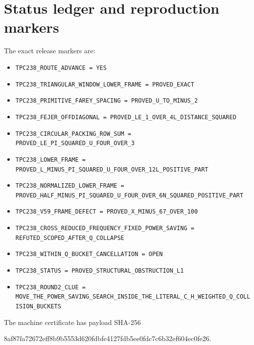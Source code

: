 \appendix
\section{Status ledger and reproduction markers}
\label{app:ledger}

\noindent The exact release markers are:

\begin{sloppypar}
\small
\raggedright
\begin{itemize}[leftmargin=1.5em]
\item \nolinkurl{TPC238_ROUTE_ADVANCE = YES}
\item \nolinkurl{TPC238_TRIANGULAR_WINDOW_LOWER_FRAME = PROVED_EXACT}
\item \nolinkurl{TPC238_PRIMITIVE_FAREY_SPACING = PROVED_U_TO_MINUS_2}
\item \nolinkurl{TPC238_FEJER_OFFDIAGONAL = PROVED_LE_1_OVER_4L_DISTANCE_SQUARED}
\item \nolinkurl{TPC238_CIRCULAR_PACKING_ROW_SUM = PROVED_LE_PI_SQUARED_U_FOUR_OVER_3}
\item \nolinkurl{TPC238_LOWER_FRAME = PROVED_L_MINUS_PI_SQUARED_U_FOUR_OVER_12L_POSITIVE_PART}
\item \nolinkurl{TPC238_NORMALIZED_LOWER_FRAME = PROVED_HALF_MINUS_PI_SQUARED_U_FOUR_OVER_6N_SQUARED_POSITIVE_PART}
\item \nolinkurl{TPC238_V59_FRAME_DEFECT = PROVED_X_MINUS_67_OVER_100}
\item \nolinkurl{TPC238_CROSS_REDUCED_FREQUENCY_FIXED_POWER_SAVING = REFUTED_SCOPED_AFTER_Q_COLLAPSE}
\item \nolinkurl{TPC238_WITHIN_Q_BUCKET_CANCELLATION = OPEN}
\item \nolinkurl{TPC238_STATUS = PROVED_STRUCTURAL_OBSTRUCTION_L1}
\item \nolinkurl{TPC238_ROUND2_CLUE = MOVE_THE_POWER_SAVING_SEARCH_INSIDE_THE_LITERAL_C_H_WEIGHTED_Q_COLLISION_BUCKETS}
\end{itemize}
\end{sloppypar}

\noindent The machine certificate has payload SHA-256
\begin{center}
\small\ttfamily
8af87fa72672eff8b9b5553d620fdbfe4127fdb5ee0fdc7c6b32ef604ec0fe26.
\end{center}
